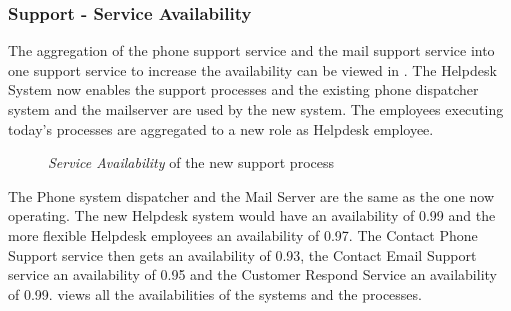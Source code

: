 \subsubsection{Support - Service Availability}
The aggregation of the phone support service and the mail support service into one support service to increase the availability can be viewed in . The Helpdesk System now enables the support processes and the existing phone dispatcher system and the mailserver are used by the new system. The employees executing today's processes are aggregated to a new role as Helpdesk employee.
\label{sec:support_analysis_to_be}
\begin{center}
	\begin{figure}[H]
		\centering
		\setlength\fboxsep{7pt}
		\setlength\fboxrule{0.5pt}
		\caption{\textsl{Service Availability} of the new support process}
		\label{fig:map_support_combined_availability_to_be}
	\end{figure}
\end{center}
The Phone system dispatcher and the Mail Server are the same as the one now operating. The new Helpdesk system would have an availability of 0.99 and the more flexible Helpdesk employees an availability of 0.97. The Contact Phone Support service then gets an availability of 0.93, the Contact Email Support service an availability of 0.95 and the Customer Respond Service an availability of 0.99.  views all the availabilities of the systems and the processes.

%







